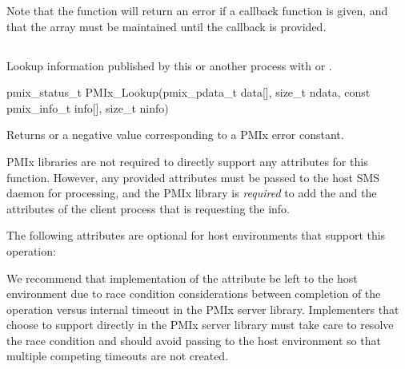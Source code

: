 Note that the function will return an error if a  callback function is given, and that the  array must be maintained until the callback is provided.


\subsection{}

\summary

Lookup information published by this or another process with  or .

\format

\cspecificstart
\begin{codepar}
pmix_status_t
PMIx_Lookup(pmix_pdata_t data[], size_t ndata,
            const pmix_info_t info[], size_t ninfo)
\end{codepar}
\cspecificend

\begin{arglist}
\end{arglist}

Returns  or a negative value corresponding to a PMIx error constant.

\reqattrstart
\ac{PMIx} libraries are not required to directly support any attributes for this function. However, any provided attributes must be passed to the host \ac{SMS} daemon for processing, and the \ac{PMIx} library is \textit{required} to add the  and the  attributes of the client process that is requesting the info.

\reqattrend

\optattrstart
The following attributes are optional for host environments that support this operation:


\optattrend

\adviceimplstart
We recommend that implementation of the  attribute be left to the host environment due to race condition considerations between completion of the operation versus internal timeout in the \ac{PMIx} server library. Implementers that choose to support  directly in the \ac{PMIx} server library must take care to resolve the race condition and should avoid passing  to the host environment so that multiple competing timeouts are not created.
\adviceimplend

